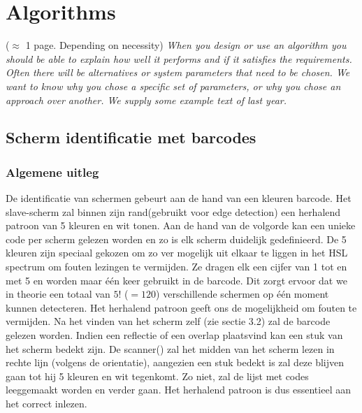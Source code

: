 \documentclass[a4paper,11pt]{article}
\newcommand{\note}[1]{{\colorbox{yellow!40!white}{#1}}}
\newcommand{\exampletext}[1]{{\color{blue!60!black}#1}}
\begin{document}
\section{Algorithms}\label{sec:technical-analysis}

\note{($\approx$ 1 page. Depending on necessity)}
\exampletext{\textit{When you design or use an algorithm you should be able to explain how well it performs and if it satisfies the requirements. Often there will be alternatives or system parameters that need to be chosen. We want to know why you chose a specific set of parameters, or why you chose an approach over another. We supply some example text of last year.}}



\subsection{Scherm identificatie met barcodes}

\subsubsection{Algemene uitleg}

De identificatie van schermen gebeurt aan de hand van een kleuren barcode. Het slave-scherm zal binnen zijn rand(gebruikt voor edge detection) een herhalend patroon van 5 kleuren en wit tonen. Aan de hand van de volgorde kan een unieke code per scherm gelezen worden en zo is elk scherm duidelijk gedefinieerd. De 5 kleuren zijn speciaal gekozen om zo ver mogelijk uit elkaar te liggen in het HSL spectrum om fouten lezingen te vermijden. Ze dragen elk een cijfer van 1 tot en met 5 en worden maar één keer gebruikt in de barcode. Dit zorgt ervoor dat we in theorie een totaal van $5!$ ($=120$) verschillende schermen op één moment kunnen detecteren. Het herhalend patroon geeft ons de mogelijkheid om fouten te vermijden. Na het vinden van het scherm zelf (zie sectie 3.2) zal de barcode gelezen worden. Indien een reflectie of een overlap plaatsvind kan een stuk van het scherm bedekt zijn. De scanner() zal het midden van het scherm lezen in rechte lijn (volgens de orientatie), aangezien een stuk bedekt is zal deze blijven gaan tot hij 5 kleuren en wit tegenkomt. Zo niet, zal de lijst met codes leeggemaakt worden en verder gaan. Het herhalend patroon is dus essentieel aan het correct inlezen.
\end{document}
